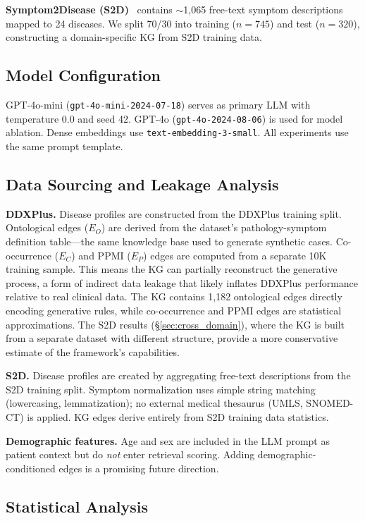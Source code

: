 \documentclass[runningheads]{llncs}
\begin{document}
\textbf{Symptom2Disease (S2D)}~\cite{gretelai_s2d} contains ${\sim}$1,065 free-text symptom descriptions mapped to 24 diseases. We split 70/30 into training ($n{=}745$) and test ($n{=}320$), constructing a domain-specific KG from S2D training data.

\subsection{Model Configuration}

GPT-4o-mini (\texttt{gpt-4o-mini-2024-07-18}) serves as primary LLM with temperature 0.0 and seed 42. GPT-4o (\texttt{gpt-4o-2024-08-06}) is used for model ablation. Dense embeddings use \texttt{text-embedding-3-small}. All experiments use the same prompt template.

\subsection{Data Sourcing and Leakage Analysis}
\label{sec:data_sourcing}

\textbf{DDXPlus.} Disease profiles are constructed from the DDXPlus training split. Ontological edges ($E_O$) are derived from the dataset's pathology-symptom definition table---the same knowledge base used to generate synthetic cases. Co-occurrence ($E_C$) and PPMI ($E_P$) edges are computed from a separate 10K training sample. This means the KG can partially reconstruct the generative process, a form of indirect data leakage that likely inflates DDXPlus performance relative to real clinical data. The KG contains 1,182 ontological edges directly encoding generative rules, while co-occurrence and PPMI edges are statistical approximations. The S2D results (\S\ref{sec:cross_domain}), where the KG is built from a separate dataset with different structure, provide a more conservative estimate of the framework's capabilities.

\textbf{S2D.} Disease profiles are created by aggregating free-text descriptions from the S2D training split. Symptom normalization uses simple string matching (lowercasing, lemmatization); no external medical thesaurus (UMLS, SNOMED-CT) is applied. KG edges derive entirely from S2D training data statistics.

\textbf{Demographic features.} Age and sex are included in the LLM prompt as patient context but do \emph{not} enter retrieval scoring. Adding demographic-conditioned edges is a promising future direction.

\subsection{Statistical Analysis}
\label{sec:stats}
\end{document}
